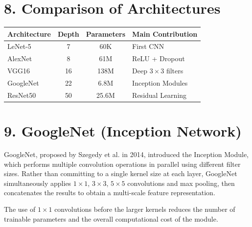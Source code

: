 \documentclass[11pt]{article}
\begin{document}
\section*{8. Comparison of Architectures}

\begin{center}

\begin{tabular}{|l|c|c|p{5.5cm}|}

\hline

Architecture & Depth & Parameters & Main Contribution\\

\hline

LeNet-5 & 7 & 60K & First CNN\\

\hline

AlexNet & 8 & 61M & ReLU + Dropout\\

\hline

VGG16 & 16 & 138M & Deep $3\times3$ filters\\

\hline

GoogleNet & 22 & 6.8M & Inception Modules\\

\hline

ResNet50 & 50 & 25.6M & Residual Learning\\

\hline

\end{tabular}

\end{center}


\section*{9. GoogleNet (Inception Network)}

GoogleNet, proposed by Szegedy et al. in 2014, introduced the Inception
Module, which performs multiple convolution operations in parallel using
different filter sizes. Rather than committing to a single kernel size at
each layer, GoogleNet simultaneously applies $1\times1$, $3\times3$,
$5\times5$ convolutions and max pooling, then concatenates the results to
obtain a multi-scale feature representation.

The use of $1\times1$ convolutions before the larger kernels reduces the
number of trainable parameters and the overall computational cost of the
module.
\end{document}
